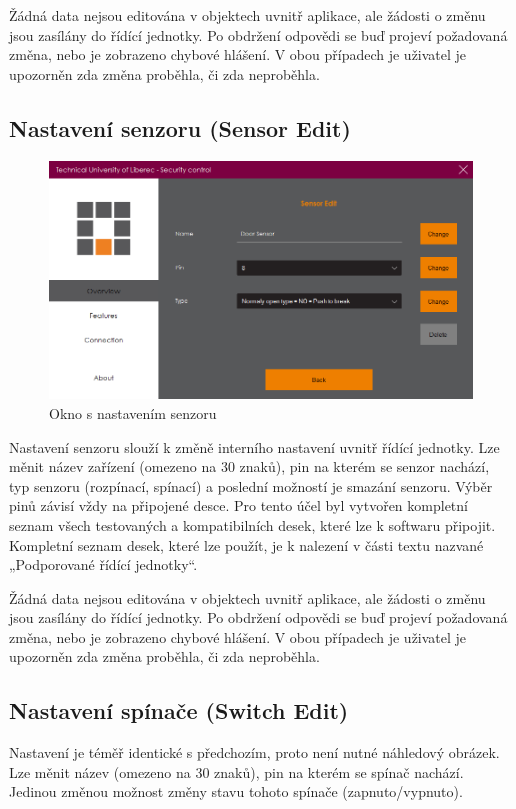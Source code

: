 \documentclass[FM,DP]{tulthesis}  %
\begin{document}
Žádná data nejsou editována v objektech uvnitř aplikace, ale žádosti o změnu jsou zasílány do řídící jednotky. Po obdržení odpovědi se buď projeví požadovaná změna, nebo je zobrazeno chybové hlášení. V obou případech je uživatel je upozorněn zda změna proběhla, či zda neproběhla.

\subsection{Nastavení senzoru (Sensor Edit)}

\begin{figure}[H]
\begin{center}
\includegraphics[width=\textwidth]{images/settings.png}
\caption{Okno s nastavením senzoru}
\label{image}
\end{center}
\end{figure}

Nastavení senzoru slouží k změně interního nastavení uvnitř řídící jednotky. Lze měnit název zařízení (omezeno na 30 znaků), pin na kterém se senzor nachází, typ senzoru (rozpínací, spínací) a poslední možností je smazání senzoru. Výběr pinů závisí vždy na připojené desce. Pro tento účel byl vytvořen kompletní seznam všech testovaných a kompatibilních desek, které lze k softwaru připojit. Kompletní seznam desek, které lze použít, je k nalezení v části textu nazvané „Podporované řídící jednotky“. 

Žádná data nejsou editována v objektech uvnitř aplikace, ale žádosti o změnu jsou zasílány do řídící jednotky. Po obdržení odpovědi se buď projeví požadovaná změna, nebo je zobrazeno chybové hlášení. V obou případech je uživatel je upozorněn zda změna proběhla, či zda neproběhla.

\subsection{Nastavení spínače (Switch Edit)}
Nastavení je téměř identické s předchozím, proto není nutné náhledový obrázek. Lze měnit název (omezeno na 30 znaků), pin na kterém se spínač nachází. Jedinou změnou možnost změny stavu tohoto spínače (zapnuto/vypnuto).
\end{document}
